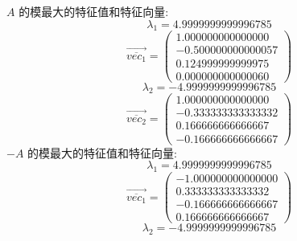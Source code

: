 \documentclass[12pt,a4paper,UTF8]{ctexart}
\begin{document}
\begin{enumerate}
          $A$ 的模最大的特征值和特征向量:
          \begin{equation}
              \lambda_{1} = 4.9999999999996785
          \end{equation}
          \begin{equation}
              \overrightarrow{\overline{vec_{1}} }=\left(\begin{array}{c}
                      1.000000000000000  \\
                      -0.500000000000057 \\
                      0.124999999999975  \\
                      0.000000000000060
                  \end{array}\right)
          \end{equation}
          \begin{equation}
              \lambda_{2} = -4.9999999999996785
          \end{equation}
          \begin{equation}
              \overrightarrow{\overline{vec_{2}} }=\left(\begin{array}{c}
                      1.000000000000000  \\
                      -0.333333333333332 \\
                      0.166666666666667  \\
                      -0.166666666666667
                  \end{array}\right)
          \end{equation}
          $-A$ 的模最大的特征值和特征向量:
          \begin{equation}
              \lambda_{1} = 4.9999999999996785
          \end{equation}
          \begin{equation}
              \overrightarrow{\overline{vec_{1}} }=\left(\begin{array}{c}
                      -1.000000000000000 \\
                      0.333333333333332  \\
                      -0.166666666666667 \\
                      0.166666666666667
                  \end{array}\right)
          \end{equation}
          \begin{equation}
              \lambda_{2} = -4.9999999999996785
          \end{equation}

\end{enumerate}
\end{document}
